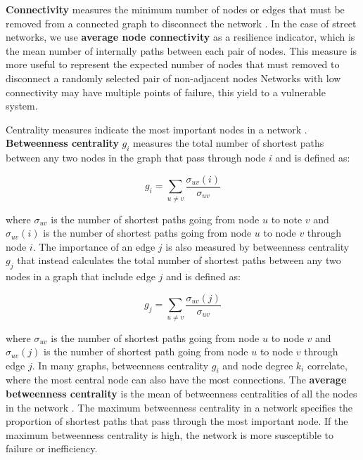 \textbf{Connectivity} measures the minimum number of nodes or edges that must be removed from a connected graph to disconnect the network \cite{urban-keitt_2001}. In the case of street networks, we use \textbf{average node connectivity} as a resilience indicator, which is the mean number of internally  paths between each pair of nodes. This measure is more useful to represent the expected number of nodes that must removed to disconnect a randomly selected pair of non-adjacent nodes \cite{beineke-oellermann-pippert_2002, dankelmann-oellermann_2003} Networks with low connectivity may have multiple points of failure, this yield to a vulnerable system. 

Centrality measures indicate the most important nodes in a network \cite{huang_2016, zhong_2017}. \textbf{Betweenness centrality} $g_i$ measures the total number of shortest paths between any two nodes in the graph that pass through node $i$ \cite{freeman_1997, ermagun-levinson_2017} and is defined as:

\begin{equation} \label{eq:6}
g_i = \sum_{u \neq v} \frac{\sigma_{uv} (i)}{\sigma_{uv}}
\end{equation}

where $\sigma_{uv}$ is the number of shortest paths going from node $u$ to note $v$ and $\sigma_{uv}(i)$ is the number of shortest paths going from node $u$ to node $v$ through node $i$. The importance of an edge $j$ is also measured by betweenness centrality $g_j$ that instead calculates the total number of shortest paths between any two nodes in a graph that include edge $j$ \cite{newman_2003} and is defined as:

\begin{equation} \label{eq:7}
g_j = \sum_{u \neq v} \frac{\sigma_{uv} (j)}{\sigma_{uv}}
\end{equation}

where $\sigma_{uv}$ is the number of shortest paths going from node $u$ to node $v$ and $\sigma_{uv}(j)$ is the number of shortest path going from node $u$ to node $v$ through edge $j$. In many graphs, betweenness centrality $g_i$ and node degree $k_i$ correlate, where the most central node can also have the most connections. The \textbf{average betweenness centrality} is the mean of betweenness centralities of all the nodes in the network \cite{barthelemy_spatial_2011}. The maximum betweenness centrality in a network specifies the proportion of shortest paths that pass through the most important node. If the maximum betweenness centrality is high, the network is more susceptible to failure or inefficiency.

